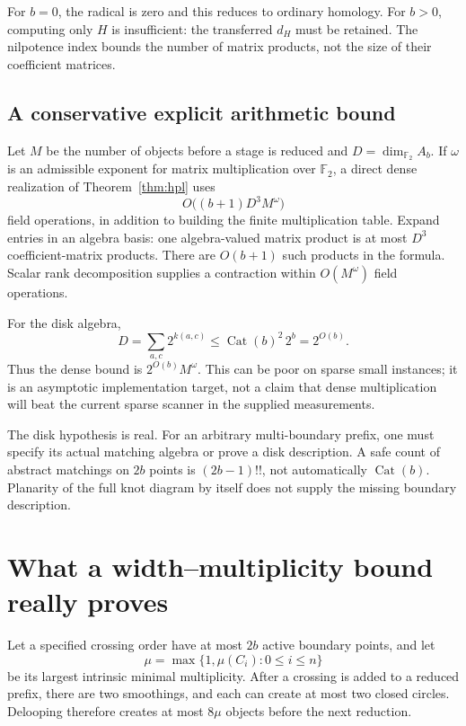 \documentclass[11pt,letterpaper]{article}
\theoremstyle{definition}
\newcommand{\F}{\mathbb F_2}
\newcommand{\Cat}{\operatorname{Cat}}
\begin{document}
For \(b=0\), the radical is zero and this reduces to ordinary homology.
For \(b>0\), computing only \(H\) is insufficient: the transferred
\(d_H\) must be retained. The nilpotence index bounds the number of
matrix products, not the size of their coefficient matrices.

\subsection{A conservative explicit arithmetic bound}

Let \(M\) be the number of objects before a stage is reduced and
\(D=\dim_{\F}A_b\). If \(\omega\) is an admissible exponent for matrix
multiplication over \(\F\), a direct dense realization of
Theorem~\ref{thm:hpl} uses
\[
                  O\bigl((b+1)D^3M^\omega\bigr)
\]
field operations, in addition to building the finite multiplication
table. Expand entries in an algebra basis: one algebra-valued matrix
product is at most \(D^3\) coefficient-matrix products. There are
\(O(b+1)\) such products in the formula. Scalar rank decomposition
supplies a contraction within \(O(M^\omega)\) field operations.

For the disk algebra,
\[
 D=\sum_{a,c}2^{k(a,c)}\le\Cat(b)^2\,2^b=2^{O(b)}.
\]
Thus the dense bound is \(2^{O(b)}M^\omega\).
This can be poor on sparse small instances; it is an asymptotic
implementation target, not a claim that dense multiplication will beat
the current sparse scanner in the supplied measurements.

The disk hypothesis is real. For an arbitrary multi-boundary prefix,
one must specify its actual matching algebra or prove a disk
description. A safe count of abstract matchings on \(2b\) points is
\((2b-1)!!\), not automatically \(\Cat(b)\). Planarity of the full knot
diagram by itself does not supply the missing boundary description.

\section{What a width--multiplicity bound really proves}
\label{sec:complexity}

Let a specified crossing order have at most \(2b\) active boundary
points, and let
\[
             \mu=\max\{1,\mu(C_i):0\le i\le n\}
\]
be its largest intrinsic minimal multiplicity.
After a crossing is added to a reduced prefix, there are two smoothings,
and each can create at most two closed circles. Delooping therefore
creates at most \(8\mu\) objects before the next reduction.
\end{document}
